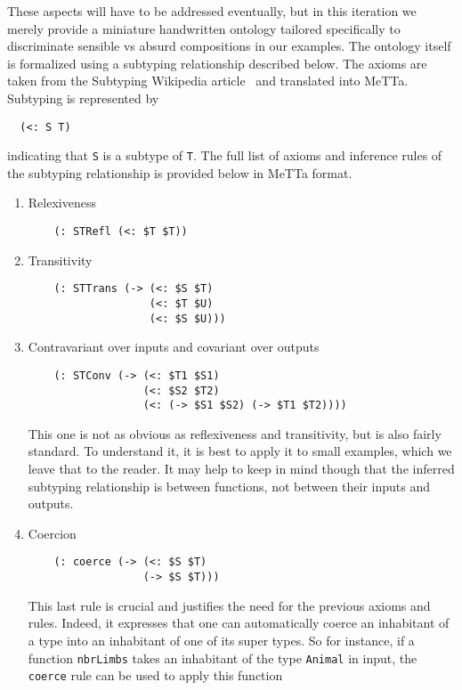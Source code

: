 \documentclass[]{report}
\begin{document}
These aspects will have to be addressed eventually, but in this
iteration we merely provide a miniature handwritten ontology tailored
specifically to discriminate sensible vs absurd compositions in our
examples.  The ontology itself is formalized using a subtyping
relationship described below.  The axioms are taken from the Subtyping
Wikipedia article~\cite{TODO} and translated into MeTTa.  Subtyping is
represented by
\begin{verbatim}
  (<: S T)
\end{verbatim}
indicating that \texttt{S} is a subtype of
\texttt{T}.  The full list of axioms and inference rules
of the subtyping relationship is provided below in MeTTa format.
\begin{enumerate}
\item Relexiveness
  \begin{verbatim}
    (: STRefl (<: $T $T))
  \end{verbatim}
\item Transitivity
  \begin{verbatim}
    (: STTrans (-> (<: $S $T)
                   (<: $T $U)
                   (<: $S $U)))
  \end{verbatim}
\item Contravariant over inputs and covariant over outputs
  \begin{verbatim}
    (: STConv (-> (<: $T1 $S1)
                  (<: $S2 $T2)
                  (<: (-> $S1 $S2) (-> $T1 $T2))))
  \end{verbatim}
  This one is not as obvious as reflexiveness and transitivity, but is
  also fairly standard.  To understand it, it is best to apply it to
  small examples, which we leave that to the reader.  It may help to
  keep in mind though that the inferred subtyping relationship is
  between functions, not between their inputs and outputs.
\item Coercion
  \begin{verbatim}
    (: coerce (-> (<: $S $T)
                  (-> $S $T)))
  \end{verbatim}
  This last rule is crucial and justifies the need for the previous
  axioms and rules.  Indeed, it expresses that one can automatically
  coerce an inhabitant of a type into an inhabitant of one of its
  super types.  So for instance, if a function
  \texttt{nbrLimbs} takes an inhabitant of the type
  \texttt{Animal} in input, the
  \texttt{coerce} rule can be used to apply this function

\end{enumerate}
\end{document}
